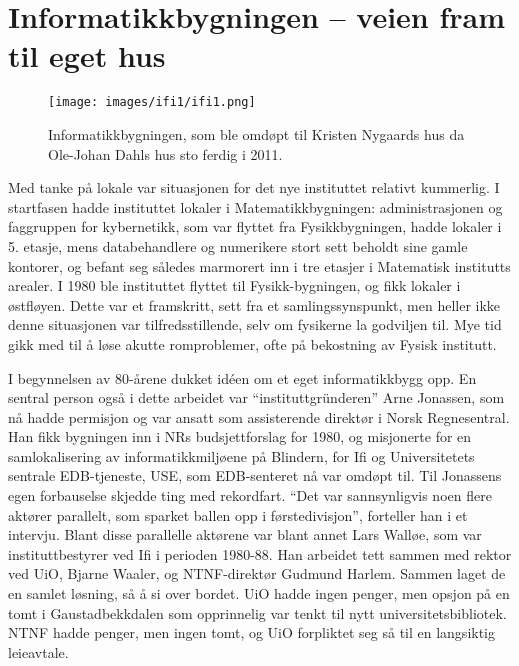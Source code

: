 \chapter[Ifi 1]{Informatikkbygningen – veien fram til eget hus}

\label{chap:ifi1}

\author{Skrevet av Narve Trædal}

\begin{figure}
	\texttt{[image: images/ifi1/ifi1.png]}
	\caption{Informatikkbygningen, som ble omdøpt til Kristen Nygaards hus da Ole-Johan Dahls hus sto ferdig i 2011.}
\end{figure}

Med tanke på lokale var situasjonen for det nye instituttet relativt kummerlig. I startfasen hadde instituttet lokaler i Matematikkbygningen: administrasjonen og faggruppen for kybernetikk, som var flyttet fra Fysikkbygningen, hadde lokaler i 5. etasje, mens databehandlere og numerikere stort sett beholdt sine gamle kontorer, og befant seg således marmorert inn i tre etasjer i Matematisk institutts arealer. I 1980 ble instituttet flyttet til Fysikk-bygningen, og fikk lokaler i østfløyen. Dette var et framskritt, sett fra et samlingssynspunkt, men heller ikke denne situasjonen var tilfredsstillende, selv om fysikerne la godviljen til. Mye tid gikk med til å løse akutte romproblemer, ofte på bekostning av Fysisk institutt.

I begynnelsen av 80-årene dukket idéen om et eget informatikkbygg opp. En sentral person også i dette arbeidet var ``instituttgründeren'' Arne Jonassen, som nå hadde permisjon og var ansatt som assisterende direktør i Norsk Regnesentral. Han fikk bygningen inn i NRs budsjettforslag for 1980, og misjonerte for en samlokalisering av informatikkmiljøene på Blindern, for Ifi og Universitetets sentrale EDB-tjeneste, USE, som EDB-senteret nå var omdøpt til. Til Jonassens egen forbauselse skjedde ting med rekordfart. ``Det var sannsynligvis noen flere aktører parallelt, som sparket ballen opp i førstedivisjon'', forteller han i et intervju. Blant disse parallelle aktørene var blant annet Lars Walløe, som var instituttbestyrer ved Ifi i perioden 1980-88. Han arbeidet tett sammen med rektor ved UiO, Bjarne Waaler, og NTNF-direktør Gudmund Harlem. Sammen laget de en samlet løsning, så å si over bordet. UiO hadde ingen penger, men opsjon på en tomt i Gaustadbekkdalen som opprinnelig var tenkt til nytt universitetsbibliotek. NTNF hadde penger, men ingen tomt, og UiO forpliktet seg så til en langsiktig leieavtale.

